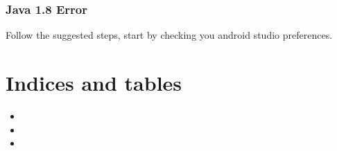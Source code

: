 \documentclass[letterpaper,10pt,english]{sphinxmanual}
\begin{document}
\subsection{Java 1.8 Error}
\label{\detokenize{common_errors:java-1-8-error}}
\sphinxAtStartPar
Follow the suggested steps, start by checking you android studio preferences.


\chapter{Indices and tables}
\label{\detokenize{index:indices-and-tables}}\begin{itemize}
\item {} 
\sphinxAtStartPar
{}

\item {} 
\sphinxAtStartPar
{}

\item {} 
\sphinxAtStartPar
{}

\end{itemize}



\renewcommand{\indexname}{Index}
\printindex
\end{document}
